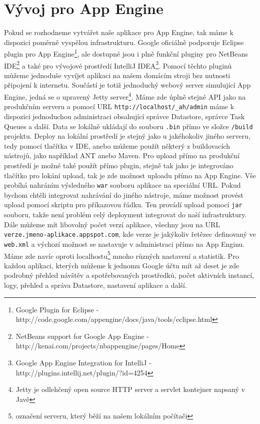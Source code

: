 \section{Vývoj pro App Engine}
Pokud se rozhodneme vytvářet naše aplikace pro App Engine, tak máme k dispozici poměrně vyspělou infrastrukturu. Google oficiálně podporuje Eclipse plugin pro App Engine\footnote{Google Plugin for Eclipse - http://code.google.com/appengine/docs/java/tools/eclipse.html},
ale dostupné jsou i plně funkční pluginy pro NetBeans IDE\footnote{NetBeans support for Google App Engine - http://kenai.com/projects/nbappengine/pages/Home}
a také pro vývojové prostředí IntelliJ IDEA\footnote{Google App Engine Integration for IntelliJ - http://plugins.intellij.net/plugin/?id=4254}. Pomocí těchto pluginů můžeme jednoduše vyvíjet aplikaci na našem domácím stroji bez nutnosti připojení k internetu. Součástí je totiž jednoduchý webový server simulující App Engine, jedná se o upravený Jetty server\footnote{Jetty je odlehčený open source HTTP server a servlet kontejner napsaný v Javě}.
Máme zde úplně stejné API jako na produkčním serveru a pomocí URL \verb|http://localhost/_ah/admin| máme k dispozici jednoduchou administraci obsahující správce Datastore, správce Task Queues a další. Data se lokálně ukládají do souboru \verb|.bin| přímo ve složce \verb|/build| projektu. Deploy na lokální prostředí je stejný jako u jakéhokoliv jiného serveru, tedy pomocí tlačítka v IDE, anebo můžeme použít některý z buildovacích nástrojů, jako například ANT anebo Maven. Pro upload přímo na produkční prostředí je možné také použít přímo plugin, stejně tak jako je integrováno tlačítko pro lokání upload, tak je zde možnost uploadu přímo na App Engine. Vše probíhá nahráním výsledného \verb|war| souboru aplikace na speciální URL. Pokud bychom chtěli integrovat nahrávání do jiného nástroje, máme možnost provést upload pomocí skriptu pro příkazovou řádku. Ten provádí upload pomocí \verb|jar| souboru, takže není problém celý deployment integrovat do naší infrastruktury. Dále můžeme mít libovolný počet verzí aplikace, všechny jsou na URL \verb|verze.jmeno-aplikace.appspot.com|, kde verze je jakýkoliv řetězec definovaný ve \verb|web.xml| a výchozí možnost se nastavuje v administraci přímo na App Enginu. Máme zde navíc oproti localhostu\footnote{označení serveru, který běží na našem lokálním počítači} mnoho různých nastavení a statistik. Pro každou aplikaci, kterých můžeme k jednomu Google účtu mít až deset je zde podrobný přehled návštěv a spotřebovaných prostředků, počet aktivních instancí, logy, přehled a správa Datastore, nastavení aplikace a další.


